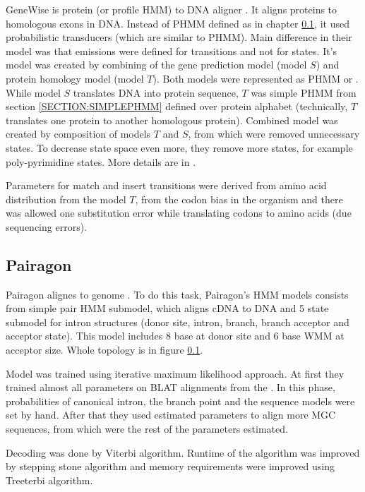 GeneWise is protein (or profile HMM) to DNA aligner \cite{GeneWise2004}. It aligns
proteins to homologous exons in DNA. Instead of PHMM defined as in chapter
\ref{}, it used probabilistic transducers (which are similar to PHMM). Main
difference in their model was that emissions were defined for transitions and
not for states.  It's model was created by combining of the gene prediction
model (model $S$) and protein homology model (model $T$). Both models were
represented as PHMM or . While model $S$ translates DNA into protein sequence, $T$ was simple PHMM
from section \ref{SECTION:SIMPLEPHMM} defined over protein alphabet
(technically, $T$ translates one protein to another homologous protein).
Combined model was created by composition of models $T$ and $S$, from which were
removed unnecessary states. To decrease state space even more, they remove more
states, for example poly-pyrimidine states. More details are in
\cite{GeneWise2004}.

Parameters for match and insert transitions were derived from amino acid
distribution from the model $T$, from the codon bias in the organism and there
was allowed one substitution error while translating codons to amino acids (due
sequencing errors).
 
\subsection{Pairagon}

Pairagon alignes  to  genome \cite{Pairagon2009}.
To do this task, Pairagon's HMM models consists from simple pair HMM submodel,
which aligns cDNA to DNA and 5 state submodel for intron structures (donor site,
intron, branch, branch acceptor and acceptor state). This model includes 8 base
 at donor site and 6 base WMM at
acceptor size. Whole topology is in figure \ref{}.

Model was trained using iterative maximum likelihood approach. At first they
trained almost all parameters on BLAT alignments from the
. In this phase, probabilities of
canonical intron, the branch point and the sequence models were set by hand.
After that they used estimated parameters to align more MGC sequences, from
which were the rest of the parameters estimated.

Decoding was done by Viterbi algorithm. Runtime of the algorithm was improved by
stepping stone algorithm \cite{} and memory requirements were improved using
Treeterbi algorithm. 


